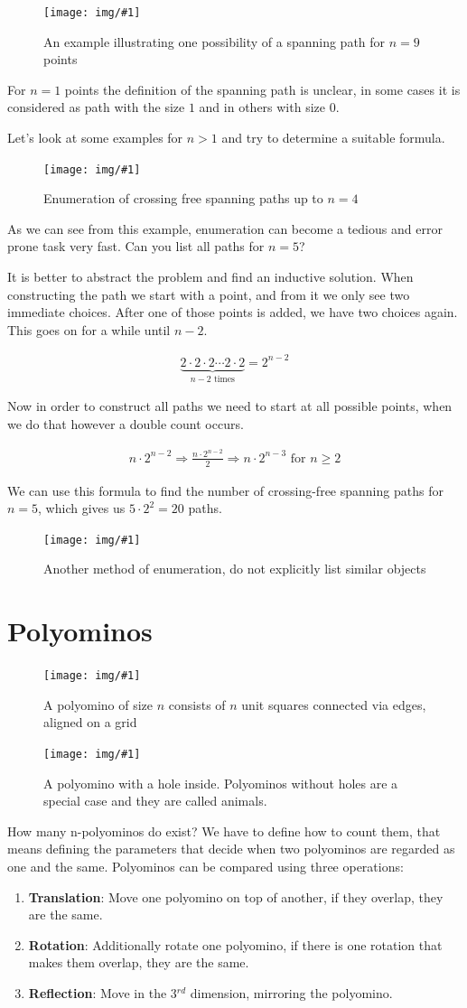 \documentclass[12pt,onecolumn%
]{scrartcl}
\newcommand{\img}[3]{
\begin{figure}[H]
	\centering
	\texttt{[image: img/\#1]}
	\captionsetup{width=0.8\textwidth, justification=centering}
	\caption{#3}
\end{figure}
}
\newcommand{\eq}[1]{
\begin{equation*}
\begin{aligned}
#1
\end{aligned}
\end{equation*}
}
\newcommand{\newsection}[1]{
\cleardoublepage
\section{#1}
}
\begin{document}
\img{crossing_free_spanning_path}
    {scale=1.5, trim=220 550 430 125}
    {An example illustrating one possibility of a spanning path for $n=9$ points}

For $n=1$ points the definition of the spanning path is unclear, in some cases it is considered as path with the size $1$ and in others with size $0$.

Let's look at some examples for $n > 1$ and try to determine a suitable formula. 

\img{crossing_free_spanning_path_enumeration}
    {scale=1, trim=270 340 200 125}
    {Enumeration of crossing free spanning paths up to $n=4$}

As we can see from this example, enumeration can become a tedious and error prone task very fast. Can you list all paths for $n=5$?

It is better to abstract the problem and find an inductive solution. When constructing the path we start with a point, and from it we only see two immediate choices. After one of those points is added, we have two choices again. This goes on for a while until $n-2$.

\eq{\underbrace{2 \cdot 2 \cdot 2 \cdots 2 \cdot 2}_{n-2 \text{ times}} = 2^{n-2}}

Now in order to construct all paths we need to start at all possible points, when we do that however a double count occurs.

\eq{n \cdot 2^{n-2} \Rightarrow \frac{n \cdot 2^{n-2}}{2} \Rightarrow n \cdot 2^{n-3} \text{ for } n \ge 2 }

We can use this formula to find the number of crossing-free spanning paths for $n=5$, which gives us $5 \cdot 2^2 = 20$ paths.

\img{crossing_free_spanning_path_n_5}
    {scale=1, trim=200 425 200 125}
    {Another method of enumeration, do not explicitly list similar objects}
    
\newsection{Polyominos}

\img{polyominos}
	{scale=1, trim=225 555 200 125}
	{A polyomino of size $n$ consists of $n$ unit squares connected via edges, aligned on a grid}
	
\img{polyominos_holes}
	{scale=1, trim=235 505 360 140}
	{A polyomino with a hole inside. Polyominos without holes are a special case and they are called animals.}	
	
How many n-polyominos do exist? We have to define how to count them, that means defining the parameters that decide when two polyominos are regarded as one and the same. Polyominos can be compared using three operations:
\begin{enumerate}
	\item {\bf Translation}: Move one polyomino on top of another, if they overlap, they are the same.
	\item {\bf Rotation}: Additionally rotate one polyomino, if there is one rotation that makes them overlap, they are the same.
	\item {\bf Reflection}: Move in the 3$^{rd}$ dimension, mirroring the polyomino.
\end{enumerate}
\end{document}
